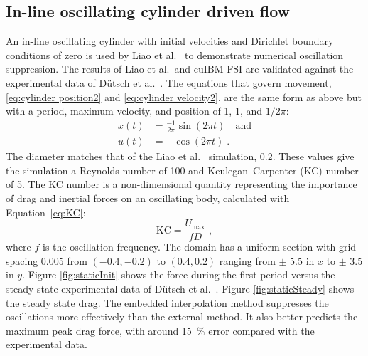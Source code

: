 \documentclass[preprint,12pt]{elsarticle}
\begin{document}
\subsection{In-line oscillating cylinder driven flow}
\label{sec:Oscillating Cylinder in no Flow}
An in-line oscillating cylinder with initial velocities and Dirichlet boundary conditions of zero is used by Liao et al.~\cite{liao2010simulating} to demonstrate numerical oscillation suppression.
The results of Liao et al.~and cuIBM-FSI are validated against the experimental data of D\"{u}tsch et al.~\cite{dutsch1998low}.
The equations that govern movement, \eqref{eq:cylinder position2} and \eqref{eq:cylinder velocity2}, are the same form as above but with a period, maximum velocity, and position of 1, 1, and $1/2\pi$:
\begin{align}
x(t) &= \frac{-1}{2\pi} \sin(2\pi t) \quad \text{and} \label{eq:cylinder position2}\\
u(t) &= -\cos(2\pi t) \;. \label{eq:cylinder velocity2}
\end{align}
The diameter matches that of the Liao et al.~\cite{liao2010simulating} simulation, 0.2.
These values give the simulation a Reynolds number of 100 and Keulegan--Carpenter (KC) number of 5.
The KC number is a non-dimensional quantity representing the importance of drag and
inertial forces on an oscillating body, calculated with Equation~\eqref{eq:KC}:
\begin{equation}
\text{KC} = \frac{U_\text{max}}{fD} \label{eq:KC} \;,
\end{equation}
where $f$ is the oscillation frequency.
The domain has a uniform section with grid spacing 0.005 from $(-0.4,-0.2)$ to $(0.4,0.2)$
ranging from $\pm$ 5.5 in $x$ to $\pm$ 3.5 in $y$.
Figure \ref{fig:staticInit} shows the force during the first period versus the steady-state
experimental data of D\"{u}tsch et al.~\cite{dutsch1998low}.
Figure \ref{fig:staticSteady} shows the steady state drag.
The embedded interpolation method suppresses the oscillations more effectively than the external method.
It also better predicts the maximum peak drag force, with around \SI{15}{\percent}
error compared with the experimental data.
\end{document}
